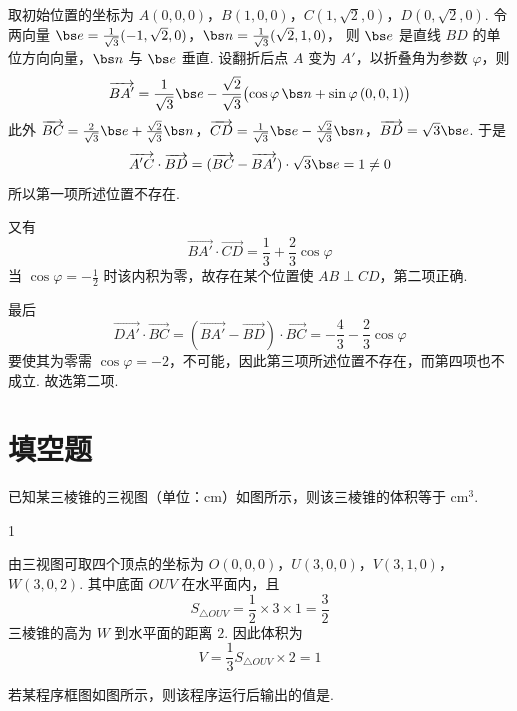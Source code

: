 \begin{solution}
取初始位置的坐标为
\(A(0,0,0)\)，\(B(1,0,0)\)，\(C(1,\sqrt2,0)\)，\(D(0,\sqrt2,0)\).
令两向量
\(\bs e=\frac1{\sqrt3}(-1,\sqrt2,0)\)，\(\bs n=\frac1{\sqrt3}(\sqrt2,1,0)\)，
则 \(\bs e\) 是直线 \(BD\) 的单位方向向量，\(\bs n\) 与 \(\bs e\) 垂直. 设翻折后点 \(A\) 变为 \(A'\)，以折叠角为参数 \(\varphi\)，则
\[
\overrightarrow{BA'}=\frac1{\sqrt3}\bs e-\frac{\sqrt2}{\sqrt3}\bigl(\cos\varphi\,\bs n+\sin\varphi\,(0,0,1)\bigr)
\]
此外
\(\overrightarrow{BC}=\frac2{\sqrt3}\bs e+\frac{\sqrt2}{\sqrt3}\bs n\)，\(\overrightarrow{CD}=\frac1{\sqrt3}\bs e-\frac{\sqrt2}{\sqrt3}\bs n\)，\(\overrightarrow{BD}=\sqrt3\bs e\).
于是
\[
\overrightarrow{A'C}\cdot\overrightarrow{BD}
=(\overrightarrow{BC}-\overrightarrow{BA'})\cdot\sqrt3\bs e=1\neq0
\]
所以第一项所述位置不存在.

又有
\[
\overrightarrow{BA'}\cdot\overrightarrow{CD}=\frac13+\frac23\cos\varphi
\]
当 \(\cos\varphi=-\frac12\) 时该内积为零，故存在某个位置使 \(AB\perp CD\)，第二项正确.

最后
\[
\overrightarrow{DA'}\cdot\overrightarrow{BC}
=(\overrightarrow{BA'}-\overrightarrow{BD})\cdot\overrightarrow{BC}
=-\frac43-\frac23\cos\varphi
\]
要使其为零需 \(\cos\varphi=-2\)，不可能，因此第三项所述位置不存在，而第四项也不成立. 故选第二项.
\end{solution}

\section{填空题}

\begin{problem}
已知某三棱锥的三视图（单位：\(\mathrm{cm}\)）如图所示，则该三棱锥的体积等于\fillinblank{} \(\mathrm{cm}^3\).

\end{problem}

\begin{answer}
1
\end{answer}

\begin{solution}
由三视图可取四个顶点的坐标为
\(O(0,0,0)\)，\(U(3,0,0)\)，\(V(3,1,0)\)，\(W(3,0,2)\).
其中底面 \(OUV\) 在水平面内，且
\[
S_{\triangle OUV}=\frac12\times3\times1=\frac32
\]
三棱锥的高为 \(W\) 到水平面的距离 \(2\). 因此体积为
\[
V=\frac13S_{\triangle OUV}\times2=1
\]
\end{solution}

\begin{problem}
若某程序框图如图所示，则该程序运行后输出的值是\fillinblank{}.

\begin{center}
\end{center}
\end{problem}


